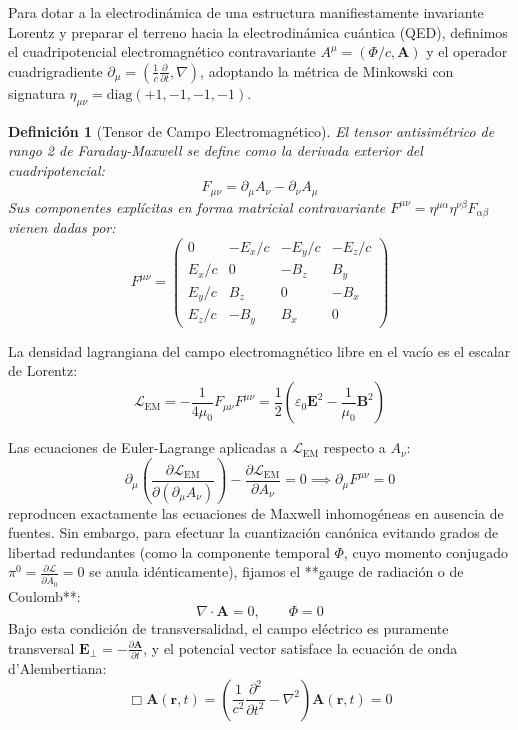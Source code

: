 \documentclass[11pt,a4paper]{book}
\newtheorem{definicion}{Definición}[chapter]
\begin{document}
Para dotar a la electrodinámica de una estructura manifiestamente invariante Lorentz y preparar el terreno hacia la electrodinámica cuántica (QED), definimos el cuadripotencial electromagnético contravariante $A^\mu = (\Phi/c, \mathbf{A})$ y el operador cuadrigradiente $\partial_\mu = \left(\frac{1}{c}\frac{\partial}{\partial t}, \nabla\right)$, adoptando la métrica de Minkowski con signatura $\eta_{\mu\nu} = \text{diag}(+1, -1, -1, -1)$.

\begin{definicion}[Tensor de Campo Electromagnético]
El tensor antisimétrico de rango 2 de Faraday-Maxwell se define como la derivada exterior del cuadripotencial:
\begin{equation}
F_{\mu\nu} = \partial_\mu A_\nu - \partial_\nu A_\mu
\end{equation}
Sus componentes explícitas en forma matricial contravariante $F^{\mu\nu} = \eta^{\mu\alpha}\eta^{\nu\beta}F_{\alpha\beta}$ vienen dadas por:
\begin{equation}
F^{\mu\nu} = \begin{pmatrix}
0 & -E_x/c & -E_y/c & -E_z/c \\
E_x/c & 0 & -B_z & B_y \\
E_y/c & B_z & 0 & -B_x \\
E_z/c & -B_y & B_x & 0
\end{pmatrix}
\end{equation}
\end{definicion}

La densidad lagrangiana del campo electromagnético libre en el vacío es el escalar de Lorentz:
\begin{equation}
\mathcal{L}_{\text{EM}} = -\frac{1}{4\mu_0} F_{\mu\nu}F^{\mu\nu} = \frac{1}{2}\left(\varepsilon_0 \mathbf{E}^2 - \frac{1}{\mu_0}\mathbf{B}^2\right)
\end{equation}

Las ecuaciones de Euler-Lagrange aplicadas a $\mathcal{L}_{\text{EM}}$ respecto a $A_\nu$:
\begin{equation}
\partial_\mu \left( \frac{\partial \mathcal{L}_{\text{EM}}}{\partial(\partial_\mu A_\nu)} \right) - \frac{\partial \mathcal{L}_{\text{EM}}}{\partial A_\nu} = 0 \implies \partial_\mu F^{\mu\nu} = 0
\end{equation}
reproducen exactamente las ecuaciones de Maxwell inhomogéneas en ausencia de fuentes. Sin embargo, para efectuar la cuantización canónica evitando grados de libertad redundantes (como la componente temporal $\Phi$, cuyo momento conjugado $\pi^0 = \frac{\partial \mathcal{L}}{\partial \dot{A}_0} = 0$ se anula idénticamente), fijamos el **gauge de radiación o de Coulomb**:
\begin{equation}
\nabla \cdot \mathbf{A} = 0, \qquad \Phi = 0
\end{equation}
Bajo esta condición de transversalidad, el campo eléctrico es puramente transversal $\mathbf{E}_\perp = -\frac{\partial \mathbf{A}}{\partial t}$, y el potencial vector satisface la ecuación de onda d'Alembertiana:
\begin{equation}
\Box \mathbf{A}(\mathbf{r}, t) = \left( \frac{1}{c^2}\frac{\partial^2}{\partial t^2} - \nabla^2 \right) \mathbf{A}(\mathbf{r}, t) = 0
\end{equation}
\end{document}

